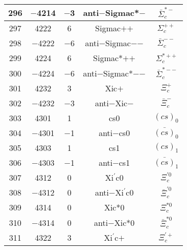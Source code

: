 \documentclass{article}
\begin{document}
\begin{table}[!htbp]
\begin{tabular}{|c|c|c|c|c|}
\hline
296 & $-$4214 & $-$3 & anti$-$Sigma\underline{\hspace{0.6em}}c*$-$ & $\bar{\Sigma}_{c}^{*-}$ \\
\hline
297 & 4222 & 6 & Sigma\underline{\hspace{0.6em}}c$+$$+$ & $\Sigma_{c}^{++}$ \\
\hline
298 & $-$4222 & $-$6 & anti$-$Sigma\underline{\hspace{0.6em}}c$-$$-$ & $\bar{\Sigma}_{c}^{--}$ \\
\hline
299 & 4224 & 6 & Sigma\underline{\hspace{0.6em}}c*$+$$+$ & $\Sigma_{c}^{*++}$ \\
\hline
300 & $-$4224 & $-$6 & anti$-$Sigma\underline{\hspace{0.6em}}c*$-$$-$ & $\bar{\Sigma}_{c}^{*--}$ \\
\hline
301 & 4232 & 3 & Xi\underline{\hspace{0.6em}}c$+$ & $\Xi_{c}^{+}$ \\
\hline
302 & $-$4232 & $-$3 & anti$-$Xi\underline{\hspace{0.6em}}c$-$ & $\bar{\Xi}_{c}^{-}$ \\
\hline
303 & 4301 & 1 & cs\underline{\hspace{0.6em}}0 & $(cs)_{0}$ \\
\hline
304 & $-$4301 & $-$1 & anti$-$cs\underline{\hspace{0.6em}}0 & $\bar{(cs)}_{0}$ \\
\hline
305 & 4303 & 1 & cs\underline{\hspace{0.6em}}1 & $(cs)_{1}$ \\
\hline
306 & $-$4303 & $-$1 & anti$-$cs\underline{\hspace{0.6em}}1 & $\bar{(cs)}_{1}$ \\
\hline
307 & 4312 & 0 & Xi$^{\prime}$\underline{\hspace{0.6em}}c0 & $\Xi_{c}^{\prime0}$ \\
\hline
308 & $-$4312 & 0 & anti$-$Xi$^{\prime}$\underline{\hspace{0.6em}}c0 & $\bar{\Xi}_{c}^{\prime0}$ \\
\hline
309 & 4314 & 0 & Xi\underline{\hspace{0.6em}}c*0 & $\Xi_{c}^{*0}$ \\
\hline
310 & $-$4314 & 0 & anti$-$Xi\underline{\hspace{0.6em}}c*0 & $\bar{\Xi}_{c}^{*0}$ \\
\hline
311 & 4322 & 3 & Xi$^{\prime}$\underline{\hspace{0.6em}}c$+$ & $\Xi_{c}^{\prime+}$ \\

\end{tabular}
\end{table}
\end{document}
